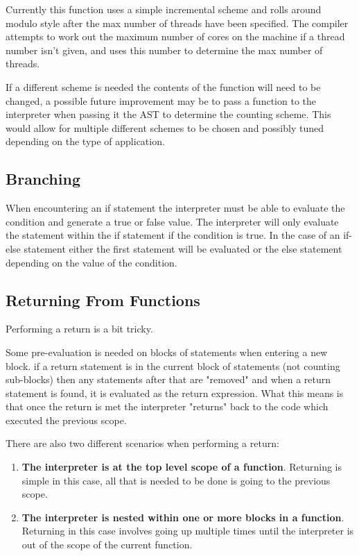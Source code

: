 Currently this function uses a simple incremental scheme and rolls around
modulo style after the max number of threads have been specified. The compiler
attempts to work out the maximum number of cores on the machine if a thread
number isn't given, and uses this number to determine the max number of threads.

If a different scheme is needed the contents of the function will need to be changed,
a possible future improvement may be to pass a function to the interpreter when passing
it the AST to determine the counting scheme. This would allow for multiple different schemes
to be chosen and possibly tuned depending on the type of application.


\subsection{Branching}
When encountering an if statement the interpreter must be able to evaluate the condition and generate a
true or false value. The interpreter will only evaluate the statement within the if statement
if the condition is true. In the case of an if-else statement either the first statement will
be evaluated or the else statement depending on the value of the condition.


\subsection{Returning From Functions}
Performing a return is a bit tricky. 

Some pre-evaluation is needed  on blocks of statements when entering a 
new block. if a return statement is
in the current block of statements (not counting sub-blocks) then
any statements after that are "removed" and when a return statement
is found, it is evaluated as the return expression.
What this means is that once the return is met the interpreter
"returns" back to the code which executed the previous scope.

There are also two different scenarios when performing a return:

\begin{enumerate}
    \item \textbf{The interpreter is at the top level scope of a function}.
            Returning is simple in this case, all that is needed to be done is
            going to the previous scope.

    \item \textbf{The interpreter is nested within one or more blocks in a function}.
            Returning in this case involves going up multiple times until the interpreter
            is out of the scope of the current function.
\end{enumerate}

